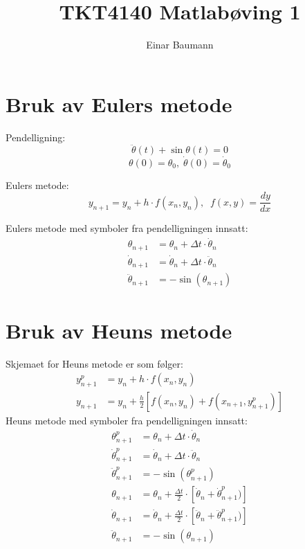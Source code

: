 



\author{Einar Baumann}
\title{TKT4140 Matlabøving 1}
\maketitle

\section{Bruk av Eulers metode} %
\label{sec:bruk_av_eulers_metode}
Pendelligning:
\begin{equation}
  \label{eq:pendulum}
  \ddot{\theta}(t) + \sin \theta(t) = 0
\end{equation}
\begin{equation}
  \nonumber
  \theta(0) = \theta_0, \; \dot{\theta}(0) = \dot{\theta}_0
\end{equation}

\noindent Eulers metode:
\begin{equation}
  y_{n+1} = y_n + h \cdot f(x_n, y_n), \;\; f(x,y) = \frac{dy}{dx}
\end{equation}

\noindent Eulers metode med symboler fra pendelligningen innsatt:
\begin{align}
  \theta_{n+1}        &= \theta_n + \Delta t \cdot \dot{\theta}_n \\
  \dot{\theta}_{n+1}  &= \dot{\theta}_n + \Delta t \cdot \ddot{\theta}_n \\
  \ddot{\theta}_{n+1} &= - \sin (\theta_{n+1})
\end{align}



\section{Bruk av Heuns metode} %
\label{sec:bruk_av_heuns_metode}
Skjemaet for Heuns metode er som følger:
\begin{align}
  y_{n+1}^p &=  y_n + h \cdot f(x_n,y_n) \\
  y_{n+1}   &=  y_n + \frac{h}{2} \left[f(x_n,y_n)+f(x_{n+1},y_{n+1}^p)\right]
\end{align}
Heuns metode med symboler fra pendelligningen innsatt:
\begin{align}
  \theta_{n+1}^p &= \theta_n + \Delta t \cdot \dot\theta_n \\
  \dot\theta_{n+1}^p &= \dot\theta_n + \Delta t \cdot \ddot\theta_n \\
  \ddot\theta_{n+1}^p &= -\sin (\theta_{n+1}^p) \\
  \theta_{n+1}     &= \theta_n + \frac{\Delta t}{2} \cdot
                      \left[\dot\theta_n+\dot\theta_{n+1}^p)\right] \\
  \dot\theta_{n+1} &= \dot\theta_n + \frac{\Delta t}{2} \cdot
                      \left[\ddot\theta_n+\ddot\theta_{n+1}^p)\right] \\
  \ddot\theta_{n+1} &= -\sin (\theta_{n+1})
\end{align}


